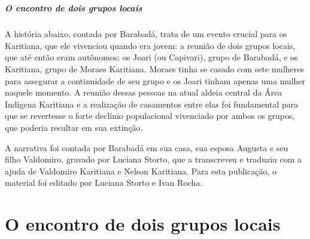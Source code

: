 \chapter*{}
\thispagestyle{empty}
\vspace*{\fill}
\paragraph{O encontro de dois grupos locais}
A história abaixo, contada por Barabadá, trata de um evento crucial para
os Karitiana, que ele vivenciou quando era jovem: a reunião de dois
grupos locais, que até então eram autônomos: os Joari (ou Capivari),
grupo de Barabadá, e os Karitiana, grupo de Moraes Karitiana. Moraes
tinha se casado com sete mulheres para assegurar a continuidade de seu
grupo e os Joari tinham apenas uma mulher naquele momento. A reunião
dessas pessoas na atual aldeia central da Área Indígena Karitiana e a
realização de casamentos entre elas foi fundamental para que se
revertesse o forte declínio populacional vivenciado por ambos os grupos,
que poderia resultar em sua extinção.

A narrativa foi contada por Barabadá em sua casa, sua esposa Augusta e
seu filho Valdomiro, gravado por Luciana Storto, que a transcreveu e
traduziu com a ajuda de Valdomiro Karitiana e Nelson Karitiana. Para
esta publicação, o material foi editado por Luciana Storto e Ivan Rocha.
\vspace*{\fill}

 \chapter{O encontro de dois grupos locais}

